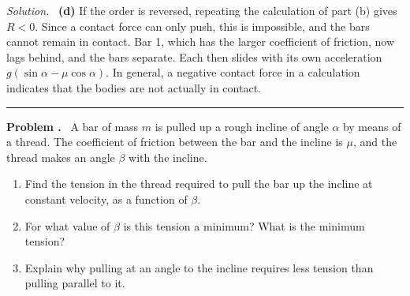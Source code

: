 \documentclass[12pt]{article}
\newcounter{problem}
\newenvironment{problem}[1][]{\refstepcounter{problem}\par\medskip\noindent\textbf{Problem \theproblem#1.}\ }{\par}
\newenvironment{solution}{\par\noindent\textit{Solution.}\ }{\hfill\rule{0.55em}{0.55em}\par}
\begin{document}
\begin{solution}
\textbf{(d)} If the order is reversed, repeating the calculation of part (b) gives $R < 0$. Since a contact force can only push, this is impossible, and the bars cannot remain in contact. Bar 1, which has the larger coefficient of friction, now lags behind, and the bars separate. Each then slides with its own acceleration $g(\sin\alpha - \mu\cos\alpha)$. In general, a negative contact force in a calculation indicates that the bodies are not actually in contact.
\end{solution}

\begin{problem}\label{prob:pull}
A bar of mass $m$ is pulled up a rough incline of angle $\alpha$ by means of a thread. The coefficient of friction between the bar and the incline is $\mu$, and the thread makes an angle $\beta$ with the incline.

\begin{center}
\end{center}

\begin{enumerate}[label=(\alph*)]
  \item Find the tension in the thread required to pull the bar up the incline at constant velocity, as a function of $\beta$.
  \item For what value of $\beta$ is this tension a minimum? What is the minimum tension?
  \item Explain why pulling at an angle to the incline requires less tension than pulling parallel to it.
\end{enumerate}
\end{problem}
\end{document}
